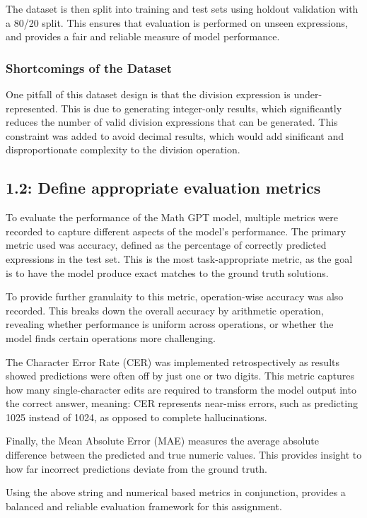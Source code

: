 The dataset is then split into training and test sets using holdout validation with a 80/20 split. This ensures that evaluation is performed on unseen expressions, and provides a fair and reliable measure of model performance.

\subsubsection{Shortcomings of the Dataset}
One pitfall of this dataset design is that the division expression is under-represented. This is due to generating integer-only results, which significantly reduces the number of valid division expressions that can be generated. This constraint was added to avoid decimal results, which would add sinificant and disproportionate complexity to the division operation.


\subsection{1.2: Define appropriate evaluation metrics}
To evaluate the performance of the Math GPT model, multiple metrics were recorded to capture different aspects of the model's performance. The primary metric used was accuracy, defined as the percentage of correctly predicted expressions in the test set. This is the most task-appropriate metric, as the goal is to have the model produce exact matches to the ground truth solutions.

To provide further granulaity to this metric, operation-wise accuracy was also recorded. This breaks down the overall accuracy by arithmetic operation, revealing whether performance is uniform across operations, or whether the model finds certain operations more challenging.

The Character Error Rate (CER) was implemented retrospectively as results showed predictions were often off by just one or two digits. This metric captures how many single-character edits are required to transform the model output into the correct answer, meaning: CER represents near-miss errors, such as predicting 1025 instead of 1024, as opposed to complete hallucinations. 

Finally, the Mean Absolute Error (MAE) measures the average absolute difference between the predicted and true numeric values. This provides insight to how far incorrect predictions deviate from the ground truth.

Using the above string and numerical based metrics in conjunction, provides a balanced and reliable evaluation framework for this assignment.

